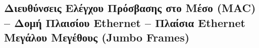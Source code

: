 %
%

\setcounter{subsection}{1}
\subsection{Διευθύνσεις Ελέγχου Πρόσβασης στο Μέσο (MAC) -- Δομή Πλαισίου Ethernet -- Πλαίσια Ethernet Μεγάλου Μεγέθους (Jumbo Frames)}
